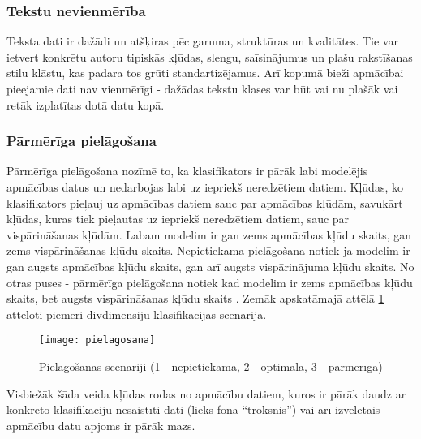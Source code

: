 \subsubsection{Tekstu nevienmērība}
Teksta dati ir dažādi un atšķiras pēc garuma, struktūras un kvalitātes. Tie var ietvert konkrētu autoru tipiskās kļūdas, slengu, saīsinājumus un plašu rakstīšanas stilu klāstu, kas padara tos grūti standartizējamus. Arī kopumā bieži apmācībai pieejamie dati nav vienmērīgi - dažādas tekstu klases var būt vai nu plašāk vai retāk izplatītas dotā datu kopā.

\subsubsection{Pārmērīga pielāgošana}
Pārmērīga pielāgošana nozīmē to, ka klasifikators ir pārāk labi modelējis apmācības datus
un nedarbojas labi uz iepriekš neredzētiem datiem. Kļūdas, ko klasifikators pieļauj uz apmācības datiem sauc par apmācības kļūdām, savukārt kļūdas, kuras tiek pieļautas uz iepriekš neredzētiem datiem, sauc par vispārināšanas kļūdām. Labam modelim ir gan zems apmācības kļūdu skaits, gan zems vispārināšanas kļūdu skaits. Nepietiekama pielāgošana notiek ja modelim ir gan augsts apmācības kļūdu skaits, gan arī augsts vispārinājuma kļūdu skaits. No otras puses - pārmērīga pielāgošana notiek kad modelim ir zems apmācības kļūdu skaits, bet augsts vispārināšanas kļūdu skaits \cite{tan2005introduction}. Zemāk apskatāmajā attēlā \ref{fig:pielagosana} attēloti piemēri divdimensiju klasifikācijas scenārijā.

\begin{figure}[H]
	\texttt{[image: pielagosana]}
	\caption{Pielāgošanas scenāriji (1 - nepietiekama, 2 - optimāla, 3 - pārmērīga)}
	\label{fig:pielagosana}
\end{figure}
 
Visbiežāk šāda veida kļūdas rodas no apmācību datiem, kuros ir pārāk daudz ar konkrēto klasifikāciju nesaistīti dati (lieks fona “troksnis”) vai arī izvēlētais apmācību datu apjoms ir pārāk mazs.

